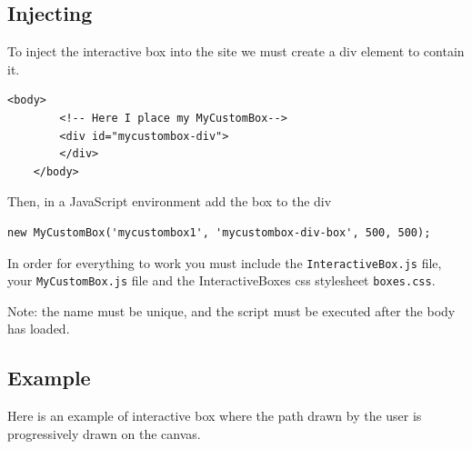 \documentclass{article}
\begin{document}
\subsection{Injecting}

To inject the interactive box into the site we must create a div element to contain it.

\begin{lstlisting}[style=html]
    <body>
        <!-- Here I place my MyCustomBox-->
        <div id="mycustombox-div">
        </div>
    </body>
\end{lstlisting}

Then, in a JavaScript environment add the box to the div

\begin{lstlisting}[style=js]
    new MyCustomBox('mycustombox1', 'mycustombox-div-box', 500, 500);
\end{lstlisting}

In order for everything to work you must include the \texttt{InteractiveBox.js} file, your \texttt{MyCustomBox.js}
file and the InteractiveBoxes css stylesheet \texttt{boxes.css}.

Note: the name must be unique, and the script must be executed after the body has loaded.

\pagebreak

\subsection{Example}

Here is an example of interactive box where the path drawn by the user is progressively drawn on the canvas.
\end{document}
